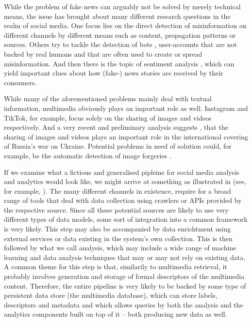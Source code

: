 While the problem of fake news can arguably not be solved by merely technical means, the issue has brought about many different research questions in the realm of social media. One focus lies on the direct detection of misinformation on different channels \cite{Zhou:2020Survey} by different means such as content, propagation patterns or sources. Others try to tackle the detection of bots \cite{Cresci:2020Decade}, user-accounts that are not backed by real humans and that are often used to create or spread misinformation. And then there is the topic of sentiment analysis \cite{Yue:2019Survey}, which can yield important clues about how (fake-) news stories are received by their consumers.

While many of the aforementioned problems mainly deal with textual information, multimedia obviously plays an important role as well. Instagram and TikTok, for example, focus solely on the sharing of images and videos respectively. And a very recent and preliminary analysis suggests \cite{Ciuriak:2022Role}, that the sharing of images and videos plays an important role in the international covering of Russia's war on Ukraine. Potential problems in need of solution could, for example, be the automatic detection of image forgeries \cite{Farid:2009Image}.

If we examine what a fictious and generalised pipleine for social media analysis and analytics would look like, we might arrive at something as illustrated in  (see, for example, \cite{Cui:2019Defend,Yang:2019XFake,Bagade:2020Kauwa}). The many different channels in existence, require for a broad range of tools that deal with data collection using crawlers or APIs provided by the respective source. Since all these potential sources are likely to use very different types of data models, some sort of integration into a common framework is very likely. This step may also be accompanied by data enrichtment using external services or data existing in the system's own collection. This is then followed by what we call analysis, which may include a wide range of machine learning and data analysis techniques that may or may not rely on existing data. A common theme for this step is that, similarily to multimedia retrieval, it probably involves generation and storage of formal descriptors of the multimedia content. Therefore, the entire pipeline is very likely to be backed by some type of persistent data store (the multimedia database), which can store labels, descriptors and metadata and which allows queries by both the analysis and the analytics components built on top of it -- both producing new data as well.

